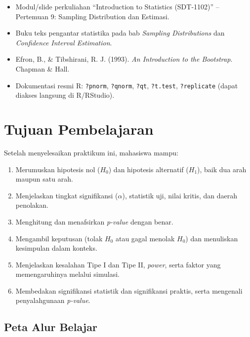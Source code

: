 \documentclass[
  indonesian,
  letterpaper,
]{book}
\providecommand{\tightlist}{%
  \setlength{\itemsep}{0pt}\setlength{\parskip}{0pt}}
\begin{document}
\begin{itemize}
\item
  Modul/slide perkuliahan ``Introduction to Statistics (SDT-1102)'' --
  Pertemuan 9: Sampling Distribution dan Estimasi.
\item
  Buku teks pengantar statistika pada bab \emph{Sampling Distributions}
  dan \emph{Confidence Interval Estimation}.
\item
  Efron, B., \& Tibshirani, R. J. (1993). \emph{An Introduction to the
  Bootstrap}. Chapman \& Hall.
\item
  Dokumentasi resmi R: \texttt{?pnorm}, \texttt{?qnorm}, \texttt{?qt},
  \texttt{?t.test}, \texttt{?replicate} (dapat diakses langsung di
  R/RStudio).
\end{itemize}


\chapter{Tujuan Pembelajaran}\label{tujuan-pembelajaran}

Setelah menyelesaikan praktikum ini, mahasiswa mampu:

\begin{enumerate}
\def\labelenumi{\arabic{enumi}.}
\tightlist
\item
  Merumuskan hipotesis nol (\(H_0\)) dan hipotesis alternatif (\(H_1\)),
  baik dua arah maupun satu arah.
\item
  Menjelaskan tingkat signifikansi (\(\alpha\)), statistik uji, nilai
  kritis, dan daerah penolakan.
\item
  Menghitung dan menafsirkan \emph{p-value} dengan benar.
\item
  Mengambil keputusan (tolak \(H_0\) atau gagal menolak \(H_0\)) dan
  menuliskan kesimpulan dalam konteks.
\item
  Menjelaskan kesalahan Tipe I dan Tipe II, \emph{power}, serta faktor
  yang memengaruhinya melalui simulasi.
\item
  Membedakan signifikansi statistik dan signifikansi praktis, serta
  mengenali penyalahgunaan \emph{p-value}.
\end{enumerate}

\section{Peta Alur Belajar}\label{peta-alur-belajar}
\end{document}
